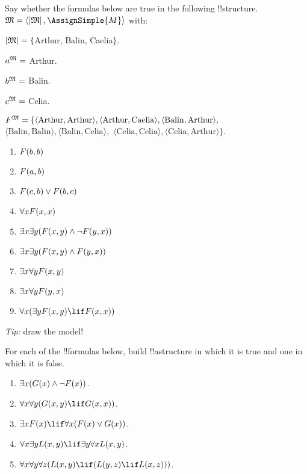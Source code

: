 \documentclass[../../../../include/open-logic-section]{subfiles}
\begin{document}


\begin{prob}
Say whether the formulas below are true
in the following !!{structure}.
$\Struct{M}=\langle\Domain{M},\AssignSimple{M}\rangle$ with:

$\Domain{M}=\{$Arthur, Balin, Caelia$\}$.

$\Assign{a}{M} =$ Arthur. 

$\Assign{b}{M} =$ Balin.

$\Assign{c}{M} =$ Celia.

$\Assign{\mathord{F}}{M} =\{\langle\mbox{Arthur},\mbox{Arthur}\rangle,\langle\mbox{Arthur},\mbox{Caelia}\rangle,\langle\mbox{Balin},\mbox{Arthur}\rangle,$
$\langle\mbox{Balin},\mbox{Balin}\rangle,\langle\mbox{Balin},\mbox{Celia}\rangle,$
$\langle\mbox{Celia},\mbox{Celia}\rangle,\langle\mbox{Celia},\mbox{Arthur}\rangle\}$.
\begin{enumerate}
\item $\mathord{F}(b,b)$
\item $\mathord{F}(a,b)$
\item $\mathord{F}(c,b)\lor \mathord{F}(b,c)$
\item $\lforall x\Atom{F}{x,x}$
\item $\lexists x\lexists y(\Atom{F}{x,y}\land\lnot \Atom{F}{y,x})$
\item $\lexists x\lexists y(\Atom{F}{x,y}\land \Atom{F}{y,x})$
\item $\lexists x\lforall y\Atom{F}{x,y}$
\item $\lexists x\lforall y\Atom{F}{y,x}$
\item $\lforall x(\lexists y\Atom{F}{x,y}\lif \Atom{F}{x,x})$
\end{enumerate}
\emph{Tip: }draw the model!
\end{prob}

\begin{prob}
For each of the !!{formula}s below, build !!a{structure}
in which it is true and one in which it is false.
\begin{enumerate}
\item $\lexists x(\Atom{G}{x}\land\lnot \Atom{F}{x})$.
\item $\lforall x\lforall y(\Atom{G}{x,y}\lif \Atom{G}{x,x})$.
\item $\lexists x\Atom{F}{x}\lif\lforall x(\Atom{F}{x}\lor \Atom{G}{x})$.
\item $\lforall x\lexists y\Atom{L}{x,y}\lif\lexists y\lforall x\Atom{L}{x,y}$.
\item $\lforall x\lforall y\lforall z(\Atom{L}{x,y}\lif(\Atom{L}{y,z}\lif \Atom{L}{x,z}))$.
\end{enumerate}
\end{prob}
\end{document}
